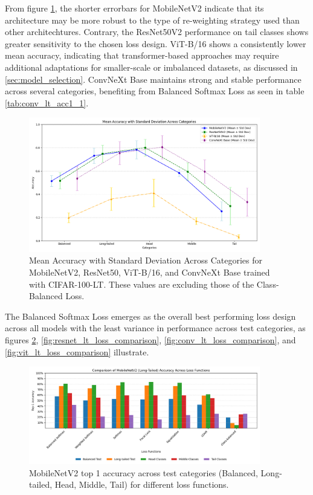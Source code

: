 From figure \ref{fig:mean_loss_comparison_line_noCB}, the shorter errorbars for MobileNetV2 indicate that its architecture may be more robust to the type of re-weighting strategy used than other architechtures. Contrary, the ResNet50V2 performance on tail classes shows greater sensitivity to the chosen loss design. ViT-B/16 shows a consistently lower mean accuracy, indicating that transformer-based approaches may require additional adaptations for smaller-scale or imbalanced datasets, as discussed in \ref{sec:model_selection}. ConvNeXt Base maintains strong and stable performance across several categories, benefiting from Balanced Softmax Loss as seen in table \ref{tab:conv_lt_acc1_1}.

\begin{figure}[H]
    \centering
    \includegraphics[width=0.9\textwidth]{Images/Plots/mean_loss_comparison_noCB.png}
    \caption{Mean Accuracy with Standard Deviation Across Categories for MobileNetV2, ResNet50, ViT-B/16, and ConvNeXt Base trained with CIFAR-100-LT. These values are excluding those of the Class-Balanced Loss.}
    \label{fig:mean_loss_comparison_line_noCB}
\end{figure}

The Balanced Softmax Loss emerges as the overall best performing loss design across all models with the least variance in performance across test categories, as figures \ref{fig:mobilenet_lt_loss_comparison}, \ref{fig:resnet_lt_loss_comparison}, \ref{fig:conv_lt_loss_comparison}, and \ref{fig:vit_lt_loss_comparison} illustrate. 



\begin{figure}[H]
    \centering
    \includegraphics[width=0.9\textwidth]{Images/Plots/mobilenet_lt_loss_comparison.png}
    \caption{MobileNetV2 top 1 accuracy across test categories (Balanced, Long-tailed, Head, Middle, Tail) for different loss functions.}
    \label{fig:mobilenet_lt_loss_comparison}
\end{figure}

